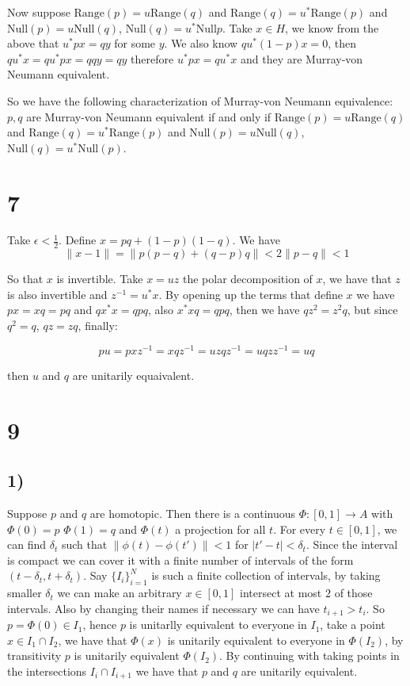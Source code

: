 \documentclass{article}
\begin{document}
Now suppose $\text{Range}(p)=u\text{Range}(q)$ and $\text{Range}(q)=u^\ast \text{Range}(p)$ 
and $\text{Null}(p)=u\text{Null}(q)$, $\text{Null}(q)=u^\ast\text{Null}{p}$.
Take $x\in H$, we know from the above that $u^\ast px=qy$ for some $y$. We also know 
$qu^\ast(1-p)x=0$, then $qu^\ast x=qu^\ast px=qqy=qy$ therefore $u^\ast px=qu^\ast x$ and they 
are Murray-von Neumann equivalent.


So we have the following characterization of Murray-von Neumann equivalence: $p,q$ are 
Murray-von Neumann equivalent if and only if $\text{Range}(p)=u\text{Range}(q)$ and $\text{Range}(q)=u^\ast \text{Range}(p)$ 
and $\text{Null}(p)=u\text{Null}(q)$, $\text{Null}(q)=u^\ast\text{Null}(p)$.


\section*{7}
Take $\epsilon<\frac{1}{2}$. Define $x=pq+(1-p)(1-q)$. We have 
\[  
\|x-1\|=\|p(p-q)+(q-p)q\|<2\|p-q\|<1    
\]

So that $x$ is invertible. Take $x=uz$ the polar decomposition of $x$, we have
that $z$ is also invertible and $z^{-1}=u^\ast x$. By opening up the terms
that define $x$ we have $px=xq=pq$ and $qx^\ast x=qpq$, also $x^\ast x q=qpq$,
then we have $qz^2=z^2q$, but since $q^2=q$, $qz=zq$, finally:

\[pu=pxz^{-1}=xqz^{-1}=uzqz^{-1}=uqzz^{-1}=uq\]

then $u$ and $q$ are unitarily equaivalent. 




\section*{9}
\subsection*{1)}
Suppose $p$ and $q$ are homotopic. Then there is a continuous $\Phi:[0,1]\to A$ with $\Phi(0)=p$
$\Phi(1)=q$ and $\Phi(t)$ a projection for all $t$. For every $t\in [0,1]$, we can find $\delta_t$
such that $\|\phi(t)-\phi(t')\|<1$ for $|t'-t|<\delta_t$. Since the interval is compact
we can cover it with a finite number of intervals of the form $(t-\delta_t,t+\delta_t)$. 
Say $\{I_i\}_{i=1}^{N}$ is such a finite collection of intervals, by taking smaller $\delta_t$
we can make an arbitrary $x\in [0,1]$ intersect at most $2$ of those intervals. Also by
changing their names if necessary we can have $t_{i+1}>t_i$. So $p=\Phi(0)\in I_1$, hence
$p$ is unitarlly equivalent to everyone in $I_1$, take a point $x\in I_1\cap I_2$, we have 
that $\Phi(x)$ is unitarily equivalent to everyone in $\Phi(I_2)$, by transitivity $p$ is 
unitarily equivalent $\Phi(I_2)$. By continuing with taking points in the intersections 
$I_i\cap I_{i+1}$ we have that $p$ and $q$ are unitarily equivalent.  
\end{document}
